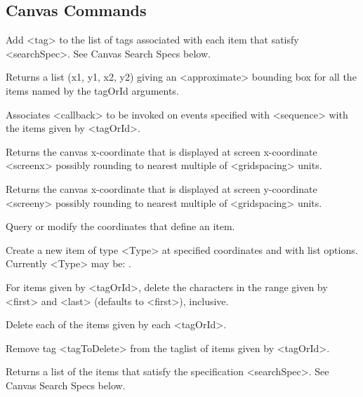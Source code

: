 \subsection*{Canvas Commands}
\begin{enum}{1cm}

Add <tag> to the list  of tags  associated  with each item that 
satisfy <searchSpec>. See Canvas Search Specs below.

Returns a list (x1, y1, x2, y2) giving an <approximate> bounding  box 
for all the items named by the tagOrId arguments.

Associates <callback> to be invoked on events specified with <sequence>
with the items given by  <tagOrId>.

Returns  the  canvas x-coordinate that is displayed at screen x-coordinate
<screenx> possibly rounding to nearest multiple of <gridspacing> units.

Returns  the  canvas x-coordinate that is displayed at screen y-coordinate
<screeny> possibly rounding to nearest multiple of <gridspacing> units.

Query  or  modify  the  coordinates  that define an item.

Create a new item of type <Type> at specified coordinates and with list
options.  Currently <Type> may be: .

For items given by <tagOrId>, delete the characters in the range given 
by <first> and  <last> (defaults to <first>),  inclusive.

Delete each of the items given by each <tagOrId>.

Remove tag <tagToDelete> from the taglist of items given by <tagOrId>.

Returns a list of the items  that  satisfy the specification <searchSpec>.
See Canvas Search Specs below.


\end{enum}
